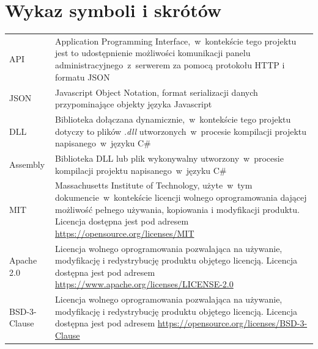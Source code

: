 \documentclass[a4paper,11pt,twoside]{report}
\theoremstyle{definition}
\begin{document}




\newpage




\chapter*{Wykaz symboli i skrótów}

\begin{tabular}{p{} p{}}
    API 
    & Application Programming Interface,~w~kontekście tego projektu jest to udostępnienie możliwości komunikacji panelu administracyjnego~z~serwerem za pomocą protokołu HTTP i formatu JSON \\
    JSON
    & Javascript Object Notation, format serializacji danych przypominające objekty języka Javascript \\
    DLL
    & Biblioteka dołączana dynamicznie,~w~kontekście tego projektu dotyczy to plików \textit{.dll} utworzonych~w~procesie kompilacji projektu napisanego~w~języku C\# \\
    Assembly
    & Biblioteka DLL lub plik wykonywalny utworzony~w~procesie kompilacji projektu napisanego~w~języku C\# \\
    MIT
    & Massachusetts Institute of Technology, użyte~w~tym dokumencie~w~kontekście licencji wolnego oprogramowania dającej możliwość pełnego używania, kopiowania i modyfikacji produktu. Licencja dostępna jest pod adresem \newline
    \url{https://opensource.org/licenses/MIT} \\
    Apache 2.0
    & Licencja wolnego oprogramowania pozwalająca na używanie, modyfikację i redystrybucję produktu objętego licencją. Licencja dostępna jest pod adresem \newline
    \url{https://www.apache.org/licenses/LICENSE-2.0} \\
    BSD-3-Clause
    & Licencja wolnego oprogramowania pozwalająca na używanie, modyfikację i redystrybucję produktu objętego licencją. Licencja dostępna jest pod adresem \newline
    \url{https://opensource.org/licenses/BSD-3-Clause}
\end{tabular}
\\
\thispagestyle{empty}
\end{document}
